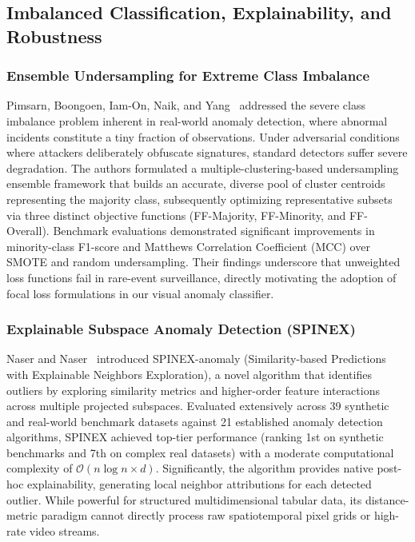 \documentclass[12pt,a4paper]{report}
\begin{document}
\subsection{Imbalanced Classification, Explainability, and Robustness}

\subsubsection{Ensemble Undersampling for Extreme Class Imbalance}
Pimsarn, Boongoen, Iam-On, Naik, and Yang~\cite{ref_pimsarn2022_imbalance} addressed the severe class imbalance problem inherent in real-world anomaly detection, where abnormal incidents constitute a tiny fraction of observations. Under adversarial conditions where attackers deliberately obfuscate signatures, standard detectors suffer severe degradation. The authors formulated a multiple-clustering-based undersampling ensemble framework that builds an accurate, diverse pool of cluster centroids representing the majority class, subsequently optimizing representative subsets via three distinct objective functions (FF-Majority, FF-Minority, and FF-Overall). Benchmark evaluations demonstrated significant improvements in minority-class F1-score and Matthews Correlation Coefficient (MCC) over SMOTE and random undersampling. Their findings underscore that unweighted loss functions fail in rare-event surveillance, directly motivating the adoption of focal loss formulations in our visual anomaly classifier.

\subsubsection{Explainable Subspace Anomaly Detection (SPINEX)}
Naser and Naser~\cite{ref_naser2025_spinex} introduced SPINEX-anomaly (Similarity-based Predictions with Explainable Neighbors Exploration), a novel algorithm that identifies outliers by exploring similarity metrics and higher-order feature interactions across multiple projected subspaces. Evaluated extensively across 39 synthetic and real-world benchmark datasets against 21 established anomaly detection algorithms, SPINEX achieved top-tier performance (ranking 1st on synthetic benchmarks and 7th on complex real datasets) with a moderate computational complexity of $\mathcal{O}(n \log n \times d)$. Significantly, the algorithm provides native post-hoc explainability, generating local neighbor attributions for each detected outlier. While powerful for structured multidimensional tabular data, its distance-metric paradigm cannot directly process raw spatiotemporal pixel grids or high-rate video streams.
\end{document}
